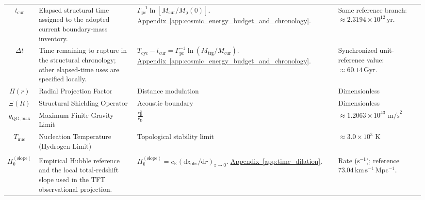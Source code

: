 \begin{longtable}{@{} c p{5.5cm} p{4cm} p{3.5cm} @{}}
$t_{\mathrm{cur}}$ & {\raggedright Elapsed structural time assigned to the adopted current boundary-mass inventory.\par} & {\raggedright $\Gamma_{\mathrm{pc}}^{-1}\ln[M_{\mathrm{cur}}/M_{\mathrm p}(0)]$. \newline \hyperref[app:cosmic_energy_budget_and_chronology]{Appendix~\ref*{app:cosmic_energy_budget_and_chronology}}.\par} & {\raggedright Same reference branch: $\approx2.3194\times10^{12}\,\mathrm{yr}$.\par} \\

$\Delta t$ & {\raggedright Time remaining to rupture in the structural chronology; other elapsed-time uses are specified locally.\par} & {\raggedright $T_{\mathrm{cyc}}-t_{\mathrm{cur}}=\Gamma_{\mathrm{pc}}^{-1}\ln(M_{\mathrm{trg}}/M_{\mathrm{cur}})$. \newline \hyperref[app:cosmic_energy_budget_and_chronology]{Appendix~\ref*{app:cosmic_energy_budget_and_chronology}}.\par} & {\raggedright Synchronized unit-reference value: $\approx60.14\,\mathrm{Gyr}$.\par} \\

$\Pi(r)$ & Radial Projection Factor & Distance modulation & Dimensionless \\

$\Xi(R)$ & Structural Shielding Operator & Acoustic boundary & Dimensionless \\

$g_{\mathrm{QG,max}}$ & Maximum Finite Gravity Limit & $\frac{c_{\mathrm{E}}^2}{r_{\mathrm{D}}}$ & $\approx 1.2063 \times 10^{43} \text{ m/s}^2$ \\

$T_{\mathrm{nuc}}$ & Nucleation Temperature (Hydrogen Limit) & Topological stability limit & $\approx 3.0 \times 10^3 \text{ K}$ \\

\begin{tabular}[c]{@{}c@{}}$H_0^{(\mathrm{obs})}$ \\ $H_0^{(\mathrm{slope})}$\end{tabular} & {\raggedright Empirical Hubble reference and the local total-redshift slope used in the TFT observational projection.\par} & {\raggedright $H_0^{(\mathrm{slope})}=c_{\mathrm E}(\mathrm dz_{\mathrm{obs}}/\mathrm dr)_{z\to0}$. \newline \hyperref[app:time_dilation]{Appendix~\ref*{app:time_dilation}}.\par} & {\raggedright Rate ($\mathrm{s^{-1}}$); reference $73.04\,\mathrm{km\,s^{-1}\,Mpc^{-1}}$.\par} \\


\end{longtable}
